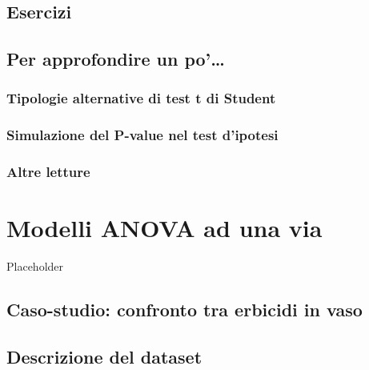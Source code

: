 \documentclass[a4paper,12pt,oneside]{book}
\begin{document}
\hypertarget{esercizi-1}{%
\section{Esercizi}\label{esercizi-1}}

\hypertarget{per-approfondire-un-po-4}{%
\section{Per approfondire un po'\ldots{}}\label{per-approfondire-un-po-4}}

\hypertarget{tipologie-alternative-di-test-t-di-student}{%
\subsection{Tipologie alternative di test t di Student}\label{tipologie-alternative-di-test-t-di-student}}

\hypertarget{simulazione-del-p-value-nel-test-dipotesi}{%
\subsection{Simulazione del P-value nel test d'ipotesi}\label{simulazione-del-p-value-nel-test-dipotesi}}

\hypertarget{altre-letture-2}{%
\subsection{Altre letture}\label{altre-letture-2}}

\hypertarget{modelli-anova-ad-una-via}{%
\chapter{Modelli ANOVA ad una via}\label{modelli-anova-ad-una-via}}

Placeholder

\hypertarget{caso-studio-confronto-tra-erbicidi-in-vaso}{%
\section{Caso-studio: confronto tra erbicidi in vaso}\label{caso-studio-confronto-tra-erbicidi-in-vaso}}

\hypertarget{descrizione-del-dataset}{%
\section{Descrizione del dataset}\label{descrizione-del-dataset}}
\end{document}
